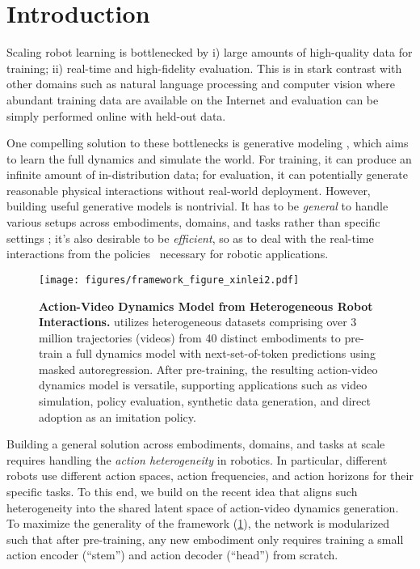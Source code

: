 \section{Introduction}
\label{sec:intro}
Scaling robot learning is bottlenecked by i) large amounts of high-quality data for training; ii) real-time and high-fidelity evaluation. This is in stark contrast with other domains such as natural language processing \cite{radford2019language,openai2023gpt4} and computer vision \cite{kirillov2023segment,videoworldsimulators2024} where abundant training data are available on the Internet and evaluation can be simply performed online with held-out data.

One compelling solution to these bottlenecks is generative modeling \cite{videoworldsimulators2024,1X_Technologies_1X_World_Model_2024}, which aims to learn the full dynamics and simulate the world. For training, it can produce an infinite amount of in-distribution data; for evaluation, it can potentially generate reasonable physical interactions without real-world deployment. However, building useful generative models is nontrivial. It has to be \emph{general} to handle various setups across embodiments, domains, and tasks rather than specific settings \cite{bruce2024genie,valevski2024diffusionmodelsrealtimegame,alonso2024diffusion}; it's also desirable to be \emph{efficient}, so as to deal with the real-time interactions from the policies~\cite{zhu2024irasim,yang2023learning} necessary for robotic applications.


\begin{figure}
\centering
\texttt{[image: figures/framework\_figure\_xinlei2.pdf]}
\caption{\label{fig:frame}
\textbf{Action-Video Dynamics Model from Heterogeneous Robot Interactions.} \ourshort utilizes heterogeneous datasets comprising over 3 million trajectories (videos) from 40 distinct embodiments to pre-train a full dynamics model with next-set-of-token predictions using masked autoregression. After pre-training, the resulting action-video dynamics model is versatile, supporting applications such as video simulation, policy evaluation, synthetic data generation, and direct adoption as an imitation policy.}
\end{figure}

Building a general solution across embodiments, domains, and tasks at scale requires handling the \textit{action heterogeneity} in robotics. In particular, different robots use different action spaces, action frequencies, and action horizons for their specific tasks. 
To this end, we build on the recent idea that aligns such heterogeneity into the shared latent space \cite{wang2024scaling,doshi2024scaling,team2024octo} of action-video dynamics generation. To maximize the generality of the framework (\cref{fig:frame}), the network is modularized such that after pre-training, any new embodiment only requires training a small action encoder (``stem'') and action decoder (``head'') from scratch.




